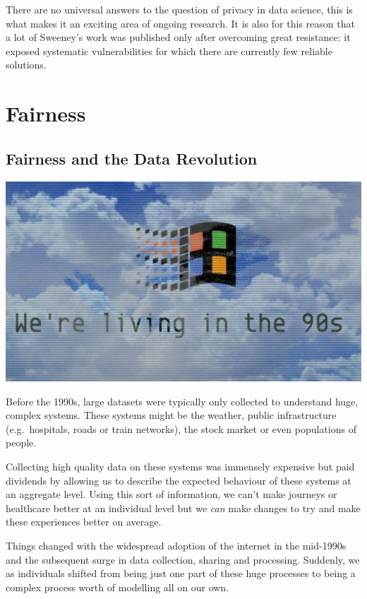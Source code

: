 \documentclass[
  letterpaper,
  DIV=11,
  numbers=noendperiod]{scrreprt}
\begin{document}
There are no universal answers to the question of privacy in data
science, this is what makes it an exciting area of ongoing research. It
is also for this reason that a lot of Sweeney's work was published only
after overcoming great resistance: it exposed systematic vulnerabilities
for which there are currently few reliable solutions.

\chapter{Fairness}\label{ethics-fairness}

\section{Fairness and the Data
Revolution}\label{fairness-and-the-data-revolution}

\includegraphics{images/502-ethics-fairness/90s-windows-wallpaper.jpg}

Before the 1990s, large datasets were typically only collected to
understand huge, complex systems. These systems might be the weather,
public infrastructure (e.g.~hospitals, roads or train networks), the
stock market or even populations of people.

Collecting high quality data on these systems was immensely expensive
but paid dividends by allowing us to describe the expected behaviour of
these systems at an aggregate level. Using this sort of information, we
can't make journeys or healthcare better at an individual level but we
\emph{can} make changes to try and make these experiences better on
average.

Things changed with the widespread adoption of the internet in the
mid-1990s and the subsequent surge in data collection, sharing and
processing. Suddenly, we as individuals shifted from being just one part
of these huge processes to being a complex process worth of modelling
all on our own.
\end{document}
